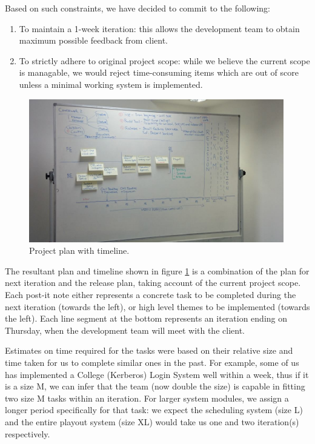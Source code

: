 \documentclass[a4paper]{article}
\begin{document}
Based on such constraints, we have decided to commit to the following:
\begin{enumerate}
  \item To maintain a 1-week iteration: this allows the development team to
        obtain maximum possible feedback from client.
  \item To strictly adhere to original project scope: while we believe the
        current scope is managable, we would reject time-consuming items which
        are out of score unless a minimal working system is implemented.
\end{enumerate}


\begin{figure}[h]
  \centering
    \includegraphics[width = 0.99\textwidth]{./planning/timeline.jpg}
   
  \caption{Project plan with timeline.}
  \label{fig:timeline}
\end{figure}

The resultant plan and timeline shown in figure \ref{fig:timeline} is a
combination of the plan for next iteration and the release plan, taking account
of the current project scope. Each post-it note either represents a 
concrete task to be completed during the next iteration (towards the left), or
high level themes to be implemented (towards the left). Each line segment at
the bottom represents an iteration ending on Thursday, when the development
team will meet with the client.

Estimates on time required for the tasks were based on their relative size and
time taken for us to complete similar ones in the past. For example, some of us
has implemented a College (Kerberos) Login System well within a week, thus if
it is a size M, we can infer that the team (now double the size) is capable in 
fitting two size M tasks within an iteration. For larger system modules, we
assign a longer period specifically for that task: we expect the scheduling
system (size L) and the entire playout system (size XL) would take us one and
two iteration(s) respectively.
\end{document}
